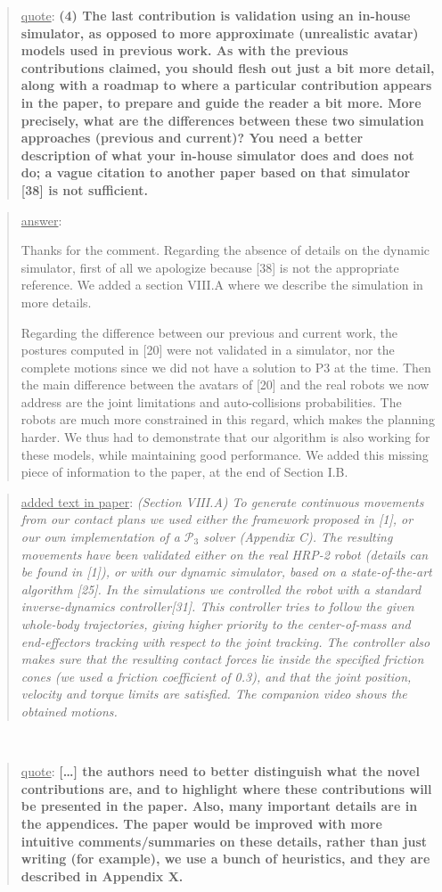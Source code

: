 \documentclass[a4paper]{article}
\newcommand{\done}[0]{}
\newcommand\quot[1]{\begin{quote} \underline{quote}: \textbf{#1}\end{quote}}
\newcommand\as[1]{\begin{quote} \underline{answer}: {#1}\end{quote} }
\newcommand\qt[1]{\begin{quote} \underline{added text in paper}: \textit{#1}\end{quote} \leavevmode \\ }
\begin{document}
\quot{
(4)	The last contribution is validation using an in-house
simulator, as opposed to more approximate (unrealistic avatar) models
used in previous work.	As with the previous contributions claimed, you
should flesh out just a bit more detail, along with a roadmap to where
a particular contribution appears in the paper, to prepare and guide
the reader a bit more. More precisely, what are the differences between
these two simulation approaches (previous and current)? You need a
better description of what your in-house simulator does and does not
do; a vague citation to another paper based on that simulator [38] is
not sufficient.}

\as{Thanks for the comment. Regarding the absence of details on the dynamic simulator, first of all we apologize because [38] is not the appropriate reference.
We added a section VIII.A where we describe the simulation in more details. 

Regarding the difference between our previous and current work, the postures computed in [20] were not validated in a simulator, nor the complete motions since 
we did not have a solution to P3 at the time. Then the main
difference between the avatars of [20] and the real robots we now address are the joint limitations and auto-collisions probabilities.
The robots are much more constrained in this regard, which makes the planning harder. We thus had to demonstrate that our algorithm is also working
for these models, while maintaining good performance.
We added this missing piece of information to the paper, at the end of Section I.B.}
\qt{(Section VIII.A) To generate continuous movements from our contact plans we used either the framework proposed in [1], or our own implementation of a $\mathcal{P}_3$ solver (Appendix C).
The resulting movements have been validated either on the real HRP-2 robot (details can be found in [1]), or with our dynamic simulator, based on a state-of-the-art algorithm [25].
In the simulations we controlled the robot with a standard inverse-dynamics controller[31].
This controller tries to follow the given whole-body trajectories, giving higher priority to the center-of-mass and end-effectors tracking with respect to the joint tracking.
The controller also makes sure that the resulting contact forces lie inside the specified friction cones (we used a friction coefficient of 0.3), and that the joint position, velocity and torque limits are satisfied.
The companion video shows the obtained motions.}
\done


\quot{[\dots] the authors need to better
distinguish what the novel contributions are, and to highlight where
these contributions will be presented in the paper.  Also, many
important details are in the appendices. The paper would be improved
with more intuitive comments/summaries on these details, rather than
just writing (for example), we use a bunch of heuristics, and they are
described in Appendix X.}
\end{document}
